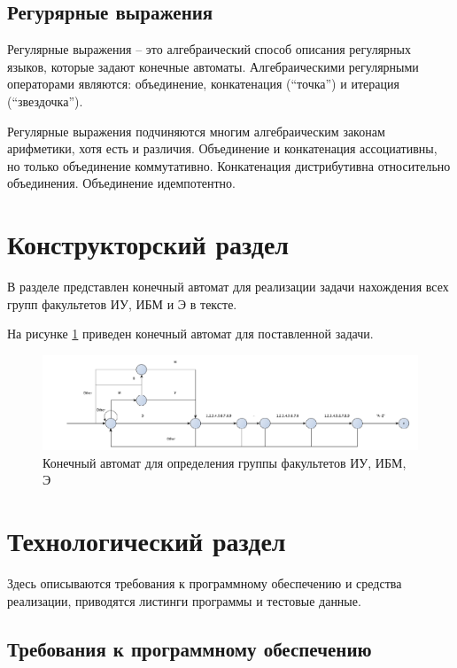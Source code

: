 \documentclass[a4paper,12pt]{article}
\begin{document}
\subsection{Регурярные выражения}

Регулярные выражения – это алгебраический способ описания
регулярных языков, которые задают конечные автоматы.
Алгебраическими регулярными операторами являются:
объединение, конкатенация (“точка”) и итерация
(“звездочка”).

Регулярные выражения подчиняются многим алгебраическим
законам арифметики, хотя есть и различия. Объединение и
конкатенация ассоциативны, но только объединение
коммутативно. Конкатенация дистрибутивна относительно
объединения. Объединение идемпотентно.

\section{Конструкторский раздел}

В разделе представлен конечный автомат для реализации задачи нахождения всех групп факультетов ИУ, ИБМ и Э в тексте.

На рисунке \ref{ris:machine} приведен конечный автомат для поставленной задачи.

\begin{figure}[h!]
	\begin{center}
		\includegraphics[scale = 0.65]{machine.pdf}
		\caption{Конечный автомат для определения группы факультетов ИУ, ИБМ, Э}
		\label{ris:machine}
	\end{center}
\end{figure}


\section{Технологический раздел}

Здесь описываются требования к программному 
обеспечению и средства реализации, приводятся листинги 
программы и тестовые данные.

\subsection{Требования к программному обеспечению}
\end{document}
